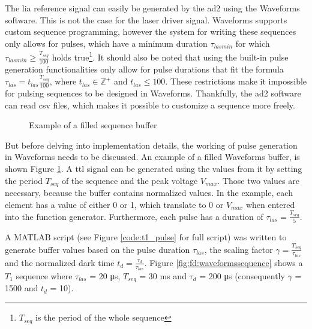 The \gls{lia} reference signal can easily be generated by the \gls{ad2} using the Waveforms software. This is not the case for the laser driver signal. Waveforms supports custom sequence programming, however the system for writing these sequences only allows for pulses, which have a minimum duration $\tau_{las min}$ for which $\tau_{las min} \geq \frac{T_{seq}}{100}$ holds true\footnote{$T_{seq}$ is the period of the whole sequence}. It should also be noted that using the built-in pulse generation functionalities only allow for pulse durations that fit the formula $\tau_{las} = t_{las}\frac{T_{seq}}{100}$, where $t_{las} \in \mathbb{Z}^+$ and $t_{las} \leq 100$. These restrictions make it impossible for pulsing sequences to be designed in Waveforms. Thankfully, the \gls{ad2} software can read \gls{csv} files, which makes it possible to customize a sequence more freely.


\begin{figure}[ht]
	\centering
	\caption{Example of a filled sequence buffer}
	\label{fig:td:driver:working_principle}
\end{figure}

But before delving into implementation details, the working of pulse generation in Waveforms needs to be discussed. An example of a filled Waveforms buffer, is shown Figure \ref{fig:td:driver:working_principle}. A \gls{ttl} signal can be generated using the values from it by setting the period $T_{seq}$ of the sequence and the peak voltage $V_{max}$. Those two values are necessary, because the buffer contains normalized values. In the example, each element has a value of either 0 or 1, which translate to 0 or $V_{max}$ when entered into the function generator. Furthermore, each pulse has a duration of $\tau_{las} = \frac{T_{seq}}{5}$.

A MATLAB script (see Figure \ref{code:t1_pulse} for full script) was written to generate buffer values based on the pulse duration $\tau_{las}$, the scaling factor $\gamma = \frac{T_{seq}}{\tau_{las}}$ and the normalized dark time $t_d = \frac{\tau_{d}}{\tau_{las}}$. Figure \ref{fig:fd:waveformssequence} shows a $T_1$ sequence where $\tau_{las}$ = 20 \unit{\micro\second}, $T_{seq}$ = 30 \unit{\milli\second} and $\tau_{d}$ = 200 \unit{\micro\second} (consequently $\gamma$ = 1500 and $t_d$ = 10). 

